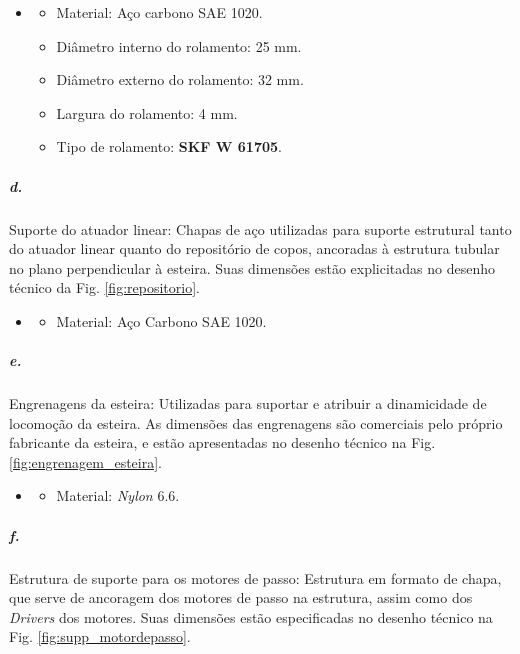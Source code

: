    \begin{itemize}
   \item[]
   \begin{itemize}
       \item  Material: Aço carbono SAE 1020.
       \item  Diâmetro interno do rolamento: 25 mm.
       \item  Diâmetro externo do rolamento: 32 mm.
       \item  Largura do rolamento: 4 mm.
       \item  Tipo de rolamento: \textbf{SKF W 61705}.
   \end{itemize}
   \end{itemize}
     
     
    
   \subparagraph*{d.} \label{retorno_suporte_atuador}  
   Suporte do atuador linear: Chapas de aço utilizadas para suporte estrutural tanto do atuador linear quanto do repositório de copos, ancoradas à estrutura tubular no plano perpendicular à esteira. Suas dimensões estão explicitadas no desenho técnico da Fig. \ref{fig:repositorio}.
    
   \begin{itemize}
   \item[]
   \begin{itemize}
       \item Material: Aço Carbono SAE 1020.
   \end{itemize}
   \end{itemize}

    
     
    \subparagraph*{e.} \label{retorno_suporte_esteira}
    Engrenagens da esteira: Utilizadas para suportar e atribuir a dinamicidade de locomoção da esteira.  As dimensões das engrenagens são comerciais pelo próprio fabricante da esteira, e estão apresentadas no desenho técnico na Fig. \ref{fig:engrenagem_esteira}.

    \begin{itemize}
   \item[]
   \begin{itemize}
       \item Material: \textit{Nylon} 6.6.
   \end{itemize}
   \end{itemize}
     
    
    
    \subparagraph*{f.} \label{retorno_suporte_motordepasso}
    Estrutura de suporte para os motores de passo: Estrutura em formato de chapa, que serve de ancoragem dos motores de passo na estrutura, assim como dos \textit{Drivers} dos motores. Suas dimensões estão especificadas no desenho técnico na Fig. \ref{fig:supp_motordepasso}.
    
